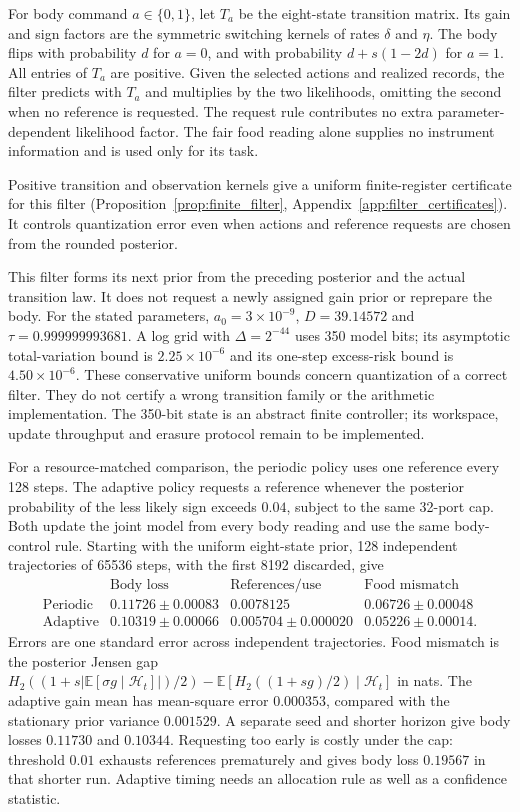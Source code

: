 \documentclass[12pt]{article}
\theoremstyle{definition}
\newcommand{\E}{\mathbb E}
\begin{document}
For body command $a\in\{0,1\}$, let $T_a$ be the eight-state transition matrix. Its gain and sign factors are the symmetric switching kernels of rates $\delta$ and $\eta$. The body flips with probability $d$ for $a=0$, and with probability $d+s(1-2d)$ for $a=1$. All entries of $T_a$ are positive. Given the selected actions and realized records, the filter predicts with $T_a$ and multiplies by the two likelihoods, omitting the second when no reference is requested. The request rule contributes no extra parameter-dependent likelihood factor. The fair food reading alone supplies no instrument information and is used only for its task.

Positive transition and observation kernels give a uniform finite-register
certificate for this filter (Proposition~\ref{prop:finite_filter},
Appendix~\ref{app:filter_certificates}). It controls quantization error
even when actions and reference requests are chosen from the rounded
posterior.

This filter forms its next prior from the preceding posterior and the actual transition law. It does not request a newly assigned gain prior or reprepare the body. For the stated parameters, $a_0=3\times10^{-9}$, $D=39.14572$ and $\tau=0.999999993681$. A log grid with $\Delta=2^{-44}$ uses 350 model bits; its asymptotic total-variation bound is $2.25\times10^{-6}$ and its one-step excess-risk bound is $4.50\times10^{-6}$. These conservative uniform bounds concern quantization of a correct filter. They do not certify a wrong transition family or the arithmetic implementation. The 350-bit state is an abstract finite controller; its workspace, update throughput and erasure protocol remain to be implemented.

For a resource-matched comparison, the periodic policy uses one reference every 128 steps. The adaptive policy requests a reference whenever the posterior probability of the less likely sign exceeds $0.04$, subject to the same 32-port cap. Both update the joint model from every body reading and use the same body-control rule. Starting with the uniform eight-state prior, 128 independent trajectories of 65536 steps, with the first 8192 discarded, give
\[
\begin{array}{lccc}
 &\text{Body loss}&\text{References/use}&\text{Food mismatch}\\
\text{Periodic}&0.11726\pm0.00083&0.0078125&0.06726\pm0.00048\\
\text{Adaptive}&0.10319\pm0.00066&0.005704\pm0.000020&0.05226\pm0.00014 .
\end{array}
\]
Errors are one standard error across independent trajectories. Food mismatch is the posterior Jensen gap $H_2((1+s|\E[\sigma g\mid\mathcal H_t]|)/2)-\E[H_2((1+sg)/2)\mid\mathcal H_t]$ in nats. The adaptive gain mean has mean-square error $0.000353$, compared with the stationary prior variance $0.001529$. A separate seed and shorter horizon give body losses $0.11730$ and $0.10344$. Requesting too early is costly under the cap: threshold $0.01$ exhausts references prematurely and gives body loss $0.19567$ in that shorter run. Adaptive timing needs an allocation rule as well as a confidence statistic.
\end{document}
